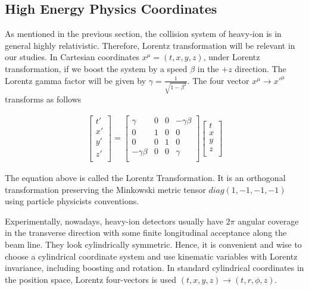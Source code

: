 \subsection{High Energy Physics Coordinates}

As mentioned in the previous section, the collision system of heavy-ion is in general highly relativistic. Therefore, Lorentz transformation will be relevant in our studies. In Cartesian coordinates $x^\mu = (t,x,y,z)$, under Lorentz transformation, if we boost the system by a speed $\beta$ in the $+z$ direction. The Lorentz gamma factor will be given by $\gamma = \frac{1}{\sqrt{1 - \beta^2}}$. The four vector $x^\mu \rightarrow x'^\mu$ transforms as follows

\begin{align}
   \begin{bmatrix} 
           t' \\
           x' \\
           y' \\
           z' \\
         \end{bmatrix} =
             \begin{bmatrix} 
             \gamma  & 0  & 0 & - \gamma \beta \\ 
            0 & 1 & 0 & 0 \\ 
             0 & 0 & 1 & 0 \\
             - \gamma  \beta & 0 & 0 &  \gamma \\
	\end{bmatrix} 
	  \begin{bmatrix} 
           t \\
           x \\
           y \\
           z \\
	\end{bmatrix}
\end{align}

The equation above is called the Lorentz Transformation. It is an orthogonal transformation preserving the Minkowski metric tensor $diag(1,-1,-1,-1)$ using particle physicists conventions.



Experimentally, nowadays, heavy-ion detectors usually have $2\pi$ angular coverage in the transverse direction with some finite longitudinal acceptance along the beam line. They look cylindrically symmetric. Hence, it is convenient and wise to choose a cylindrical coordinate system and use kinematic variables with Lorentz invariance, including boosting and rotation. In standard cylindrical coordinates in the position space, Lorentz four-vectors is used $(t,x,y,z) \rightarrow (t, r, \phi, z)$. 



